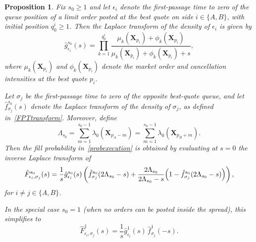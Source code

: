 \documentclass[11pt]{article}
\newtheorem{proposition}{Proposition}
\begin{document}
\begin{proposition}\label{prop_fillprob}
Fix $s_0\geq 1$ and let $\epsilon_i$ denote the first-passage time to zero of the queue position of a limit order posted at the best quote on side $i\in\{A,B\}$, with initial position $q_0^i\geq 1$. Then the Laplace transform of the density of $\epsilon_i$ is given by
\begin{equation}\label{Laplacedeath}
\hat{g}_{\epsilon_i}^{s_0}(s)
=
\prod_{k=1}^{q_0^i}
\frac{\mu_k(\boldsymbol{X}_{p_i})+\phi_k(\boldsymbol{X}_{p_i})}
{\mu_k(\boldsymbol{X}_{p_i})+\phi_k(\boldsymbol{X}_{p_i})+s},
\end{equation}
where $\mu_k(\boldsymbol{X}_{p_i})$ and $\phi_k(\boldsymbol{X}_{p_i})$ denote the market order and cancellation intensities at the best quote $p_i$.

Let $\sigma_j$ be the first-passage time to zero of the opposite best-quote queue, and let $\hat{f}_{\sigma_j}^{s_0}(s)$ denote the Laplace transform of the density of $\sigma_j$, as defined in~\eqref{FPTtransform}. Moreover, define
\[
\Lambda_{s_0}
=
\sum_{m=1}^{s_0-1}\lambda_0(\boldsymbol{X}_{p_A-m})
=
\sum_{m=1}^{s_0-1}\lambda_0(\boldsymbol{X}_{p_B+m}).
\]
Then the fill probability in~\eqref{probexecution} is obtained by evaluating at $s=0$ the inverse Laplace transform of
\begin{equation}\label{LTexecution}
\hat{F}_{\epsilon_i,\sigma_j}^{s_0}(s)
=
\frac{1}{s}\hat{g}_{\epsilon_i}^{s_0}(s)
\left(
\hat{f}_{\sigma_j}^{s_0}(2\Lambda_{s_0}-s)
+
\frac{2\Lambda_{s_0}}{2\Lambda_{s_0}-s}
\Bigl(1-\hat{f}_{\sigma_j}^{s_0}(2\Lambda_{s_0}-s)\Bigr)
\right),
\end{equation}
for $i\neq j\in\{A,B\}$.

In the special case $s_0=1$ (when no orders can be posted inside the spread), this simplifies to
\begin{equation}
\hat{F}_{\epsilon_i,\sigma_j}^{1}(s)
=
\frac{1}{s}\hat{g}_{\epsilon_i}^{1}(s)\,
\hat{f}_{\sigma_j}^{1}(-s).
\end{equation}
\end{proposition}
\end{document}
